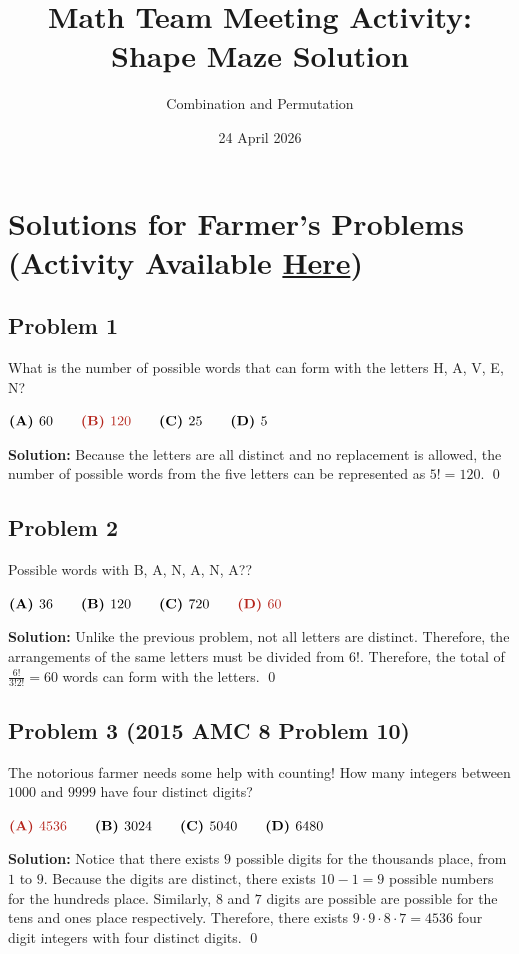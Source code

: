 \documentclass{article}
\title{\textbf{Math Team Meeting Activity: Shape Maze Solution}}
\author{Combination and Permutation}
\date{24 April 2026}
\newenvironment{solution}
    {\begin{trivlist}\item[]{\bf Solution:}}
    {\qed \end{trivlist}}
\begin{document}
\section{
Solutions for Farmer's Problems
\footnotesize (Activity Available \href{link}{Here})
}

\subsection*{\textcolor{BrickRed}{Problem 1}}
{\color {Gray}
What is the number of possible words that can form
with the letters H, A, V, E, N?

$
\textbf{(A) } 60  \qquad
\textcolor{BrickRed}{\textbf{(B) } 120} \qquad
\textbf{(C) } 25  \qquad
\textbf{(D) } 5
$
}

\begin{solution}
Because the letters are all distinct and no
replacement is allowed, the number of possible
words from the five letters can be represented
as $5! = 120$.
\end{solution}


\subsection*{\textcolor{BrickRed}{Problem 2}}
{\color {Gray}
Possible words with B, A, N, A, N, A??

$
\textbf{(A) } 36  \qquad
\textbf{(B) } 120 \qquad
\textbf{(C) } 720 \qquad
\textcolor{BrickRed}{\textbf{(D) } 60}
$
}

\begin{solution}
Unlike the previous problem, not all letters are
distinct. Therefore, the arrangements of the same
letters must be divided from $6!$. Therefore,
the total of $\frac{6!}{3!2!} = 60$ words can form
with the letters.
\end{solution}


\subsection*{
\textcolor{BrickRed}{Problem 3
\footnotesize (2015 AMC 8 Problem 10)}}
{\color {Gray}
The notorious farmer needs some help with counting!
How many integers between $1000$ and $9999$ have four
distinct digits?

$
\textcolor{BrickRed}{\textbf{(A) } 4536} \qquad
\textbf{(B) } 3024 \qquad
\textbf{(C) } 5040 \qquad
\textbf{(D) } 6480
$
}

\begin{solution}
Notice that there exists $9$ possible digits for
the thousands place, from $1$ to $9$. Because the
digits are distinct, there exists $10 - 1 = 9$
possible numbers for the hundreds place. Similarly,
$8$ and $7$ digits are possible are possible for
the tens and ones place respectively. Therefore,
there exists $9 \cdot 9 \cdot 8 \cdot 7 = 4536$
four digit integers with four distinct digits.
\end{solution}
\end{document}
